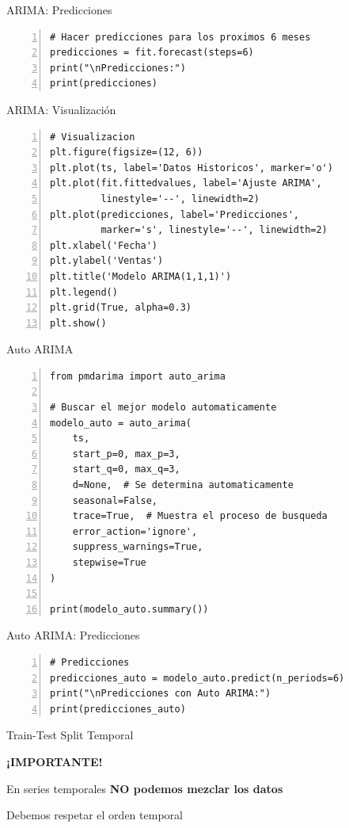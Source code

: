 \documentclass{beamer}
\begin{document}
\begin{frame}[fragile]{ARIMA: Predicciones}
    \begin{lstlisting}[numbers=left, numbersep=5pt]
# Hacer predicciones para los proximos 6 meses
predicciones = fit.forecast(steps=6)
print("\nPredicciones:")
print(predicciones)
    \end{lstlisting}
\end{frame}

\begin{frame}[fragile]{ARIMA: Visualización}
    \begin{lstlisting}[numbers=left, numbersep=5pt]
# Visualizacion
plt.figure(figsize=(12, 6))
plt.plot(ts, label='Datos Historicos', marker='o')
plt.plot(fit.fittedvalues, label='Ajuste ARIMA',
         linestyle='--', linewidth=2)
plt.plot(predicciones, label='Predicciones',
         marker='s', linestyle='--', linewidth=2)
plt.xlabel('Fecha')
plt.ylabel('Ventas')
plt.title('Modelo ARIMA(1,1,1)')
plt.legend()
plt.grid(True, alpha=0.3)
plt.show()
    \end{lstlisting}
\end{frame}

\begin{frame}[fragile]{Auto ARIMA}
    \begin{lstlisting}[numbers=left, numbersep=5pt]
from pmdarima import auto_arima

# Buscar el mejor modelo automaticamente
modelo_auto = auto_arima(
    ts,
    start_p=0, max_p=3,
    start_q=0, max_q=3,
    d=None,  # Se determina automaticamente
    seasonal=False,
    trace=True,  # Muestra el proceso de busqueda
    error_action='ignore',
    suppress_warnings=True,
    stepwise=True
)

print(modelo_auto.summary())
    \end{lstlisting}
\end{frame}

\begin{frame}[fragile]{Auto ARIMA: Predicciones}
    \begin{lstlisting}[numbers=left, numbersep=5pt]
# Predicciones
predicciones_auto = modelo_auto.predict(n_periods=6)
print("\nPredicciones con Auto ARIMA:")
print(predicciones_auto)
    \end{lstlisting}
\end{frame}

\begin{frame}{Train-Test Split Temporal}
    \begin{center}
        \Large{\textbf{¡IMPORTANTE!}}
        
        \vspace{0.8cm}
        
        En series temporales \textbf{NO podemos mezclar los datos}
        
        \vspace{0.5cm}
        
        Debemos respetar el orden temporal
    \end{center}
\end{frame}
\end{document}
